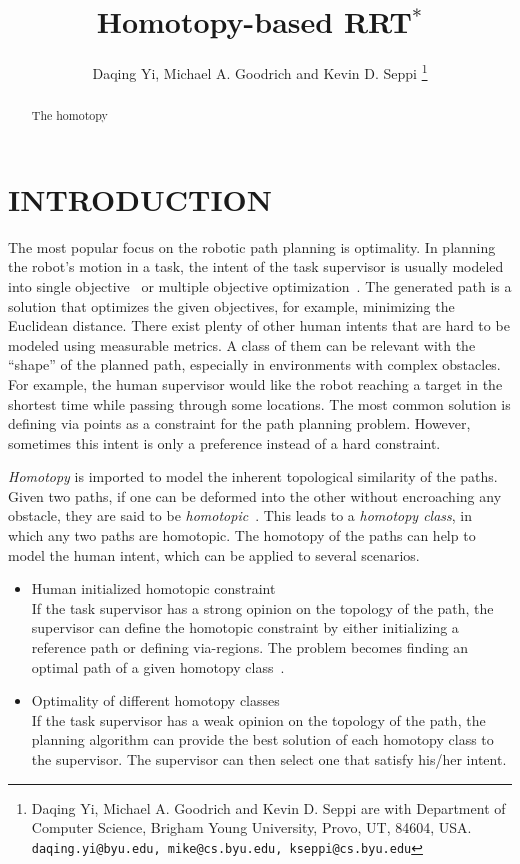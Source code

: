 \documentclass[letterpaper, 10 pt, conference]{ieeeconf}
\title{\LARGE \bf
Homotopy-based RRT$^{*}$
}
\author{
Daqing Yi, Michael A. Goodrich and Kevin D. Seppi
\thanks{Daqing Yi, Michael A. Goodrich and Kevin D. Seppi are with Department of Computer Science, Brigham Young University, Provo, UT, 84604, USA.
{\tt\small daqing.yi@byu.edu, mike@cs.byu.edu, kseppi@cs.byu.edu} }
}
\begin{document}
\maketitle
\thispagestyle{empty}
\pagestyle{empty}


\begin{abstract}
The homotopy 


\end{abstract}


\section{INTRODUCTION}
\label{sec:intro}

The most popular focus on the robotic path planning is optimality.
In planning the robot's motion in a task, the intent of the task supervisor is usually modeled into single objective~\cite{6974170} or multiple objective optimization~\cite{yi2014supporting}.
The generated path is a solution that optimizes the given objectives, for example, minimizing the Euclidean distance.
There exist plenty of other human intents that are hard to be modeled using measurable metrics.
A class of them can be relevant with the ``shape'' of the planned path, especially in environments with complex obstacles.
For example, the human supervisor would like the robot reaching a target in the shortest time while passing through some locations.
The most common solution is defining via points as a constraint for the path planning problem.
However, sometimes this intent is only a preference instead of a hard constraint.

\emph{Homotopy} is imported to model the inherent topological similarity of the paths.
Given two paths, if one can be deformed into the other without encroaching any obstacle, they are said to be \emph{homotopic}~\cite{Hernandez201544}.
This leads to a \emph{homotopy class}, in which any two paths are homotopic.
The homotopy of the paths can help to model the human intent, which can be applied to several scenarios.
\begin{itemize}
\item Human initialized homotopic constraint \\
If the task supervisor has a strong opinion on the topology of the path, the supervisor can define the homotopic constraint by either initializing a reference path or defining via-regions.
The problem becomes finding an optimal path of a given homotopy class~\cite{Hershberger199463}.
\item Optimality of different homotopy classes \\
If the task supervisor has a weak opinion on the topology of the path, the planning algorithm can provide the best solution of each homotopy class to the supervisor.
The supervisor can then select one that satisfy his/her intent.
\end{itemize}
\end{document}
